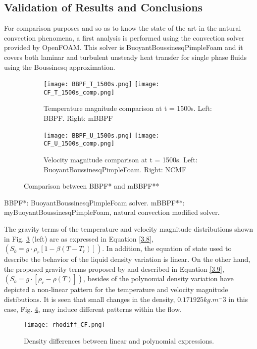 \subsection{Validation of Results and Conclusions}
For comparison purposes and so as to know the state of the art in the natural convection phenomena, a first analysis is performed using the convection solver provided by OpenFOAM. This solver is BuoyantBoussinesqPimpleFoam and it covers both laminar and turbulent unsteady heat transfer for single phase fluids using the Boussinesq approximation. 
\begin{figure}[h!]
	\centering
	\begin{subfigure}{\linewidth}
	\texttt{[image: BBPF\_T\_1500s.png]}\hfill
	\texttt{[image: CF\_T\_1500s\_comp.png]}	
	\caption{Temperature magnitude comparison at t = 1500s. Left: BBPF. Right: mBBPF}
	\label{3.5figa}
	\end{subfigure}\par\medskip
	\begin{subfigure}{\linewidth}
	\texttt{[image: BBPF\_U\_1500s.png]}\hfill
	\texttt{[image: CF\_U\_1500s\_comp.png]}	
	\caption{Velocity magnitude comparison at t = 1500s. Left: BuoyantBoussinesqPimpleFoam. Right: NCMF}
	\label{3.5figb}
	\end{subfigure}\par\medskip
	\caption{Comparison between BBPF* and mBBPF**}
	\label{3.5fig}
\end{figure}
\newline 
BBPF*: BuoyantBoussinesqPimpleFoam solver.
mBBPF**: myBuoyantBoussinesqPimpleFoam, natural convection modified solver.

\noindent The gravity terms of the temperature and velocity magnitude distributions shown in Fig. \ref{3.5fig} (left) are as expressed in Equation \ref{3.8}, $(S_{b} = g\cdot\rho_{r}[1-\beta(T-T_{r})])$. In addition, the equation of state used to describe the behavior of the liquid density variation is linear. On the other hand, the proposed gravity terms proposed by \cite{bourdillon_2016} and described in Equation \ref{3.9}, $(S_{b} = g\cdot[\rho_{r}-\rho(T)])$, besides of the polynomial density variation have depicted a non-linear pattern for the temperature and velocity magnitude distibutions. It is seen that small changes in the density, $0.171925 kg.m^-3$ in this case, Fig. \ref{rhodifffig}, may induce different patterns within the flow. 
\clearpage
\begin{figure}[h!]
	\centering
	\texttt{[image: rhodiff\_CF.png]}\hfill
	\caption{Density differences between linear and polynomial expressions.}
	\label{rhodifffig}
\end{figure} 


